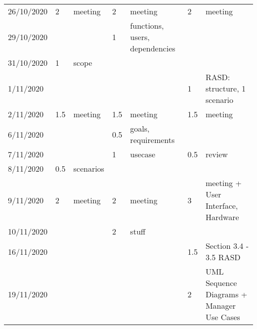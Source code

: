 \begin{table}
\begin{tabular}{|l|l|l|l|l|l|l|}
    26/10/2020    & 2              & meeting                       & 2              & meeting                               & 2              & meeting                                   \\
    29/10/2020    &                &                               & 1              & functions, users, dependencies        &                &                                           \\
    31/10/2020    & 1              & scope                         &                &                                       &                &                                           \\
    1/11/2020     &                &                               &                &                                       & 1              & RASD: structure, 1 scenario               \\
    2/11/2020     & 1.5            & meeting                       & 1.5            & meeting                               & 1.5            & meeting                                   \\
    6/11/2020     &                &                               & 0.5            & goals, requirements                   &                &                                           \\
    7/11/2020     &                &                               & 1              & usecase                               & 0.5            & review                                    \\
    8/11/2020     & 0.5            & scenarios                     &                &                                       &                &                                           \\
    9/11/2020     & 2              & meeting                       & 2              & meeting                               & 3              & meeting + User Interface, Hardware        \\
    10/11/2020    &                &                               & 2              & stuff                                 &                &                                           \\
    16/11/2020    &                &                               &                &                                       & 1.5            & Section 3.4 - 3.5 RASD                    \\
    19/11/2020    &                &                               &                &                                       & 2              & UML Sequence Diagrams + Manager Use Cases \\

\end{tabular}
\end{table}
